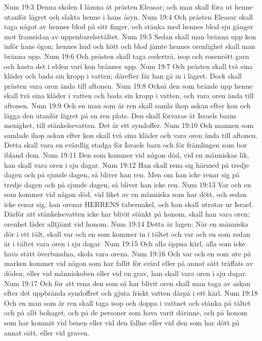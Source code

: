 Num 19:3  Denna skolen I lämna åt prästen Eleasar; och man skall föra ut henne utanför lägret och slakta henne i hans åsyn.
Num 19:4  Och prästen Eleasar skall taga något av hennes blod på sitt finger, och stänka med hennes blod sju gånger mot framsidan av uppenbarelsetältet.
Num 19:5  Sedan skall man bränna upp kon inför hans ögon; hennes hud och kött och blod jämte hennes orenlighet skall man bränna upp.
Num 19:6  Och prästen skall taga cederträ, isop och rosenrött garn och kasta det i elden vari kon brännes upp.
Num 19:7  Och prästen skall två sina kläder och bada sin kropp i vatten; därefter får han gå in i lägret. Dock skall prästen vara oren ända till aftonen.
Num 19:8  Också den som brände upp henne skall två sina kläder i vatten och bada sin kropp i vatten, och vara oren ända till aftonen.
Num 19:9  Och en man som är ren skall samla ihop askan efter kon och lägga den utanför lägret på en ren plats. Den skall förvaras åt Israels barns menighet, till stänkelsevatten. Det är ett syndoffer.
Num 19:10  Och mannen som samlade ihop askan efter kon skall två sina kläder och vara oren ända till aftonen. Detta skall vara en evärdlig stadga för Israels barn och för främlingen som bor ibland dem.
Num 19:11  Den som kommer vid någon död, vid en människas lik, han skall vara oren i sju dagar.
Num 19:12  Han skall rena sig härmed på tredje dagen och på sjunde dagen, så bliver han ren. Men om han icke renar sig på tredje dagen och på sjunde dagen, så bliver han icke ren.
Num 19:13  Var och en som kommer vid någon död, vid liket av en människa som har dött, och sedan icke renar sig, han orenar HERRENS tabernakel, och han skall utrotas ur Israel. Därför att stänkelsevatten icke har blivit stänkt på honom, skall han vara oren; orenhet låder alltjämt vid honom.
Num 19:14  Detta är lagen: När en människa dör i ett tält, skall var och en som kommer in i tältet och var och en som redan är i tältet vara oren i sju dagar.
Num 19:15  Och alla öppna kärl, alla som icke hava stått överbundna, skola vara orena.
Num 19:16  Och var och en som ute på marken kommer vid någon som har fallit för svärd eller på annat sätt träffats av döden, eller vid människoben eller vid en grav, han skall vara oren i sju dagar.
Num 19:17  Och för att rena den som så har blivit oren skall man taga av askan efter det uppbrända syndoffret och gjuta friskt vatten därpå i ett kärl.
Num 19:18  Och en man som är ren skall taga isop och doppa i vattnet och stänka på tältet och på allt bohaget, och på de personer som hava varit därinne, och på honom som har kommit vid benen eller vid den fallne eller vid den som har dött på annat sätt, eller vid graven.
